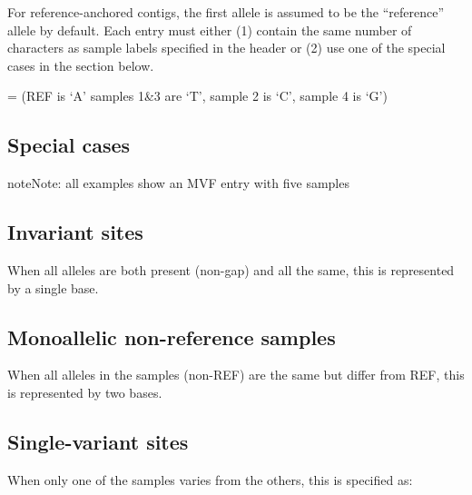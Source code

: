 \documentclass[letterpaper,11pt,english]{sphinxmanual}
\begin{document}
For reference-anchored contigs, the first allele is assumed to be the “reference” allele by default. Each entry must either (1) contain the same number of characters as sample labels specified in the header or (2) use one of the special cases in the section below.

 =  (REF is ‘A’ samples 1\&3 are ‘T’, sample 2 is ‘C’, sample 4 is ‘G’)


\subsection{Special cases}
\label{\detokenize{mvf_spec:special-cases}}
\begin{sphinxadmonition}{note}{Note:}
all examples show an MVF entry with five samples
\end{sphinxadmonition}


\subsection{Invariant sites}
\label{\detokenize{mvf_spec:invariant-sites}}
When all alleles are both present (non-gap) and all the same, this is represented by a single base.
\begin{quote}

\end{quote}


\subsection{Monoallelic non-reference samples}
\label{\detokenize{mvf_spec:monoallelic-non-reference-samples}}
When all alleles in the samples (non-REF) are the same but differ from REF, this is represented by two bases.
\begin{quote}

\end{quote}


\subsection{Single-variant sites}
\label{\detokenize{mvf_spec:single-variant-sites}}
When only one of the samples varies from the others, this is specified as:

%
\begin{sphinxVerbatim}[commandchars=\\\{\}]
\PYG{p}{[}    \PYG{p}{]}
\end{sphinxVerbatim}
\end{document}
